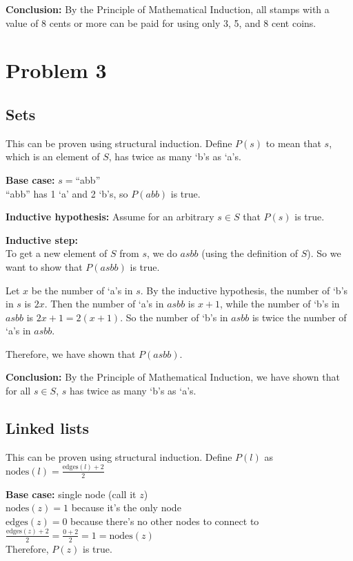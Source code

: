 \documentclass[12pt, leqno]{article}
\begin{document}
\textbf{Conclusion:} By the Principle of Mathematical Induction, all stamps with a value of 8 cents or more can be paid for using only 3, 5, and 8 cent coins.

\pagebreak

\section*{Problem 3}

\subsection*{Sets}

This can be proven using structural induction. Define $P(s)$ to mean that $s$, which is an element of $S$, has twice as many `b's as `a's.

\textbf{Base case:} $s = $``abb''\\
``abb'' has 1 `a' and 2 `b's, so $P(abb)$ is true.

\textbf{Inductive hypothesis:} Assume for an arbitrary $s \in S$ that $P(s)$ is true.

\textbf{Inductive step:}\\
To get a new element of $S$ from $s$, we do $asbb$ (using the definition of $S$). So we want to show that $P(asbb)$ is true.

Let $x$ be the number of `a's in $s$. By the inductive hypothesis, the number of `b's in $s$ is $2x$. Then the number of `a's in $asbb$ is $x+1$, while the number of `b's in $asbb$ is $2x+1 = 2(x+1)$. So the number of `b's in $asbb$ is twice the number of `a's in $asbb$.

Therefore, we have shown that $P(asbb)$.

\textbf{Conclusion:} By the Principle of Mathematical Induction, we have shown that for all $s \in S$, $s$ has twice as many `b's as `a's.

\pagebreak

\subsection*{Linked lists}

This can be proven using structural induction. Define $P(l)$ as $\displaystyle \mathrm{nodes}(l) = \frac{\mathrm{edges}(l) + 2}{2}$

\textbf{Base case:} single node (call it $z$)\\
$\mathrm{nodes}(z) = 1$ because it's the only node\\
$\mathrm{edges}(z) = 0$ because there's no other nodes to connect to\\
$\displaystyle \frac{\mathrm{edges}(z) + 2}{2} = \frac{0+2}{2} = 1 = \mathrm{nodes}(z)$\\ Therefore, $P(z)$ is true.
\end{document}
